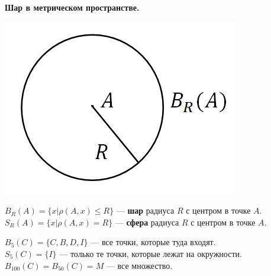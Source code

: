 \begin{definition}
\textbf{Шар в метрическом пространстве.}\begin{center}
    \includegraphics[scale=0.5]{l4_2.png}\end{center}
$B_R(A) = \{x | \rho(A, x) \leqslant R \}$ --- \textbf{шар} радиуса $R$ с центром в точке $A$.\\ 
$S_R(A) = \{x | \rho(A, x) = R \}$ --- \textbf{сфера} радиуса $R$ с центром в точке $A$.
\end{definition}
$B_5(C) = \{ C, B, D, I \}$ --- все точки, которые туда входят. \\
$S_5(C) = \{ I \}$ --- только те точки, которые лежат на окружности. \\
$B_{100}(C) = B_{50} (C) = M $ --- все множество. \\

